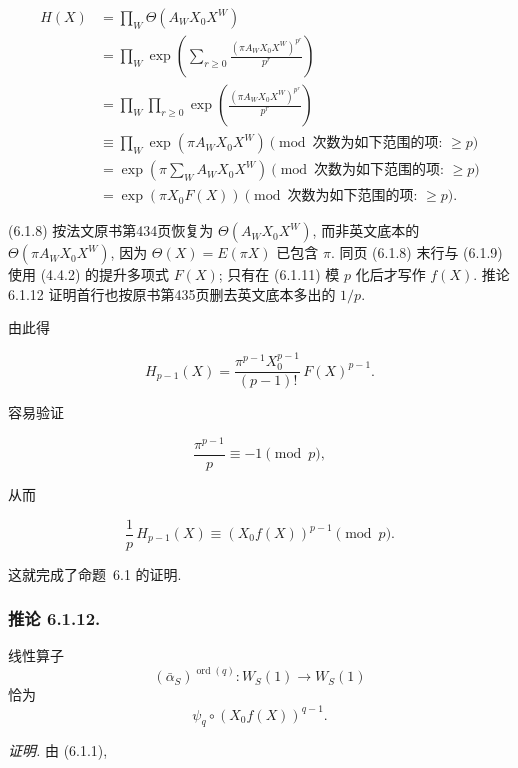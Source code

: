 \begin{equation}\tag{6.1.8}
\begin{aligned}
H(X)
&=\prod_W\Theta(A_WX_0X^W)\\
&=\prod_W\exp\!\left(
\sum_{r\geq0}\frac{(\pi A_WX_0X^W)^{p^r}}{p^r}
\right)\\
&=\prod_W\prod_{r\geq0}
\exp\!\left(\frac{(\pi A_WX_0X^W)^{p^r}}{p^r}\right)\\
&\equiv\prod_W\exp(\pi A_WX_0X^W)
\pmod{\text{次数为如下范围的项: }\geq p}\\
&=\exp\!\left(\pi\sum_WA_WX_0X^W\right)
\pmod{\text{次数为如下范围的项: }\geq p}\\
&=\exp(\pi X_0F(X))
\pmod{\text{次数为如下范围的项: }\geq p}.
\end{aligned}
\end{equation}

\begin{editorialnote}
(6.1.8) 按法文原书第434页恢复为 $\Theta(A_WX_0X^W)$, 而非英文底本的 $\Theta(\pi A_WX_0X^W)$,
因为 $\Theta(X)=E(\pi X)$ 已包含 $\pi$. 同页 (6.1.8) 末行与 (6.1.9) 使用 (4.4.2) 的提升多项式 $F(X)$;
只有在 (6.1.11) 模 $p$ 化后才写作 $f(X)$. 推论 6.1.12 证明首行也按原书第435页删去英文底本多出的 $1/p$.
\end{editorialnote}

由此得

\begin{equation}\tag{6.1.9}
H_{p-1}(X)
=\frac{\pi^{p-1}X_0^{p-1}}{(p-1)!}\,F(X)^{p-1}.
\end{equation}

容易验证

\begin{equation}\tag{6.1.10}
\frac{\pi^{p-1}}p\equiv-1\pmod p,
\end{equation}

从而

\begin{equation}\tag{6.1.11}
\frac1p\,H_{p-1}(X)
\equiv(X_0f(X))^{p-1}\pmod p.
\end{equation}

这就完成了命题~6.1 的证明.

\subsubsection*{推论 6.1.12.}
线性算子
\[
(\bar\alpha_S)^{\operatorname{ord}(q)}:W_S(1)\longrightarrow W_S(1)
\]
恰为
\[
\psi_q\circ(X_0f(X))^{q-1}.
\]

\noindent\emph{证明.}
由 (6.1.1),

